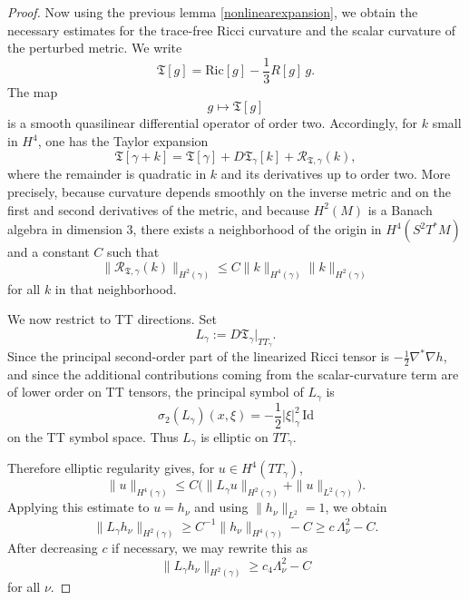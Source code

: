 \documentclass{amsart}
\begin{document}
\begin{proof}
\noindent Now using the previous lemma \ref{nonlinearexpansion}, we obtain the necessary estimates for the trace-free Ricci curvature and the scalar curvature of the perturbed metric.
We write
\[
\mathfrak T[g]=\text{Ric}[g]-\frac13R[g]\,g.
\]
The map
\[
g\longmapsto \mathfrak T[g]
\]
is a smooth quasilinear differential operator of order two. Accordingly, for $k$ small in $H^4$, one has the Taylor expansion
\[
\mathfrak T[\gamma+k]
=
\mathfrak T[\gamma]
+
D\mathfrak T_\gamma[k]
+
\mathcal R_{\mathfrak T,\gamma}(k),
\]
where the remainder is quadratic in $k$ and its derivatives up to order two. More precisely, because curvature depends smoothly on the inverse metric and on the first and second derivatives of the metric, and because $H^2(M)$ is a Banach algebra in dimension $3$, there exists a neighborhood of the origin in $H^4(S^2T^*M)$ and a constant $C$ such that
\begin{equation}
\label{eq:RTremainder}
\|\mathcal R_{\mathfrak T,\gamma}(k)\|_{H^2(\gamma)}
\le
C\|k\|_{H^4(\gamma)}\|k\|_{H^2(\gamma)}
\end{equation}
for all $k$ in that neighborhood.

\noindent We now restrict to TT directions. Set
\[
L_\gamma:=D\mathfrak T_\gamma\big|_{TT_\gamma}.
\]
Since the principal second-order part of the linearized Ricci tensor is $-\frac12\nabla^*\nabla h$, and since the additional contributions coming from the scalar-curvature term are of lower order on TT tensors, the principal symbol of $L_\gamma$ is
\[
\sigma_2(L_\gamma)(x,\xi)
=
-\frac12|\xi|_\gamma^2\,\text{Id}
\]
on the TT symbol space. Thus $L_\gamma$ is elliptic on $TT_\gamma$.

\noindent Therefore elliptic regularity gives, for $u\in H^4(TT_\gamma)$,
\[
\|u\|_{H^4(\gamma)}
\le
C\bigl(\|L_\gamma u\|_{H^2(\gamma)}+\|u\|_{L^2(\gamma)}\bigr).
\]
Applying this estimate to $u=h_\nu$ and using $\|h_\nu\|_{L^2}=1$, we obtain
\[
\|L_\gamma h_\nu\|_{H^2(\gamma)}
\ge
C^{-1}\|h_\nu\|_{H^4(\gamma)}-C
\ge
c\,\Lambda_\nu^2-C.
\]
After decreasing $c$ if necessary, we may rewrite this as
\begin{equation}
\label{eq:Lgamma-lower}
\|L_\gamma h_\nu\|_{H^2(\gamma)}
\ge
c_4\Lambda_\nu^2-C
\end{equation}
for all $\nu$.


\end{proof}
\end{document}
